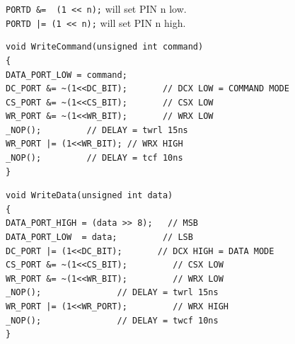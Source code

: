 \noindent\texttt{PORTD &= ~(1 << n);} will set PIN n low.\\

\noindent\texttt{PORTD |= (1 << n);} will set PIN n high.

\begin{verbatim}
void WriteCommand(unsigned int command)
{
DATA_PORT_LOW = command;
DC_PORT &= ~(1<<DC_BIT);       // DCX LOW = COMMAND MODE
CS_PORT &= ~(1<<CS_BIT);       // CSX LOW
WR_PORT &= ~(1<<WR_BIT);       // WRX LOW
_NOP();			// DELAY = twrl 15ns
WR_PORT |= (1<<WR_BIT);	// WRX HIGH
_NOP();			// DELAY = tcf 10ns
}
\end{verbatim}

\begin{verbatim}
void WriteData(unsigned int data)
{
DATA_PORT_HIGH = (data >> 8);	// MSB
DATA_PORT_LOW  = data;	       // LSB
DC_PORT |= (1<<DC_BIT);	      // DCX HIGH = DATA MODE
CS_PORT &= ~(1<<CS_BIT);	     // CSX LOW
WR_PORT &= ~(1<<WR_BIT);	     // WRX LOW
_NOP();			      // DELAY = twrl 15ns
WR_PORT |= (1<<WR_PORT);	     // WRX HIGH
_NOP();			      // DELAY = twcf 10ns
}
\end{verbatim}